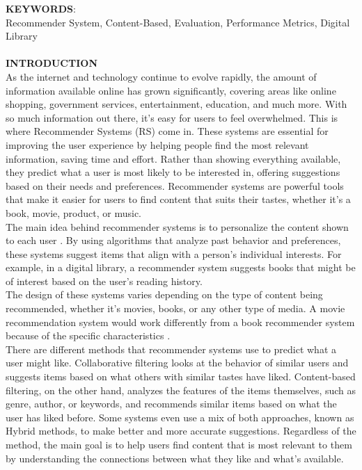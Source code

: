 \documentclass[10pt, oneside,english,hidelinks,a4paper]{article}
\begin{document}
\begin{multicols}{2}
%
\textbf{KEYWORDS}:\\Recommender System, Content-Based, Evaluation, Performance Metrics, Digital Library\\\\
%
\textbf{INTRODUCTION}\\
As the internet and technology continue to evolve rapidly, the amount of information available online has grown significantly, covering areas like online shopping, government services, entertainment, education, and much more. With so much information out there, it’s easy for users to feel overwhelmed. This is where Recommender Systems (RS) come in. These systems are essential for improving the user experience by helping people find the most relevant information, saving time and effort. Rather than showing everything available, they predict what a user is most likely to be interested in, offering suggestions based on their needs and preferences. Recommender systems are powerful tools that make it easier for users to find content that suits their tastes, whether it’s a book, movie, product, or music.\\
%
The main idea behind recommender systems is to personalize the content shown to each user \cite{Aymen2022896}. By using algorithms that analyze past behavior and preferences, these systems suggest items that align with a person’s individual interests. For example, in a digital library, a recommender system suggests books that might be of interest based on the user’s reading history. \\
The design of these systems varies depending on the type of content being recommended, whether it’s movies, books, or any other type of media. A movie recommendation system would work differently from a book recommender system because of the specific characteristics \cite{pub.1036183961}.\\
%
There are different methods that recommender systems use to predict what a user might like. Collaborative filtering looks at the behavior of similar users and suggests items based on what others with similar tastes have liked. Content-based filtering, on the other hand, analyzes the features of the items themselves, such as genre, author, or keywords, and recommends similar items based on what the user has liked before. Some systems even use a mix of both approaches, known as Hybrid methods, to make better and more accurate suggestions. Regardless of the method, the main goal is to help users find content that is most relevant to them by understanding the connections between what they like and what’s available.\\

\end{multicols}
\end{document}
